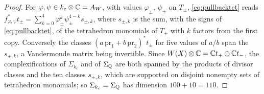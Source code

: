 \begin{proof}
For $\varphi,\psi\in k_{c}\otimes\mathbb{C}=A_{W}$, with values $\varphi_{\pm}$,
$\psi_{\pm}$ on $T_{\pm}$, \eqref{eq:pullbacktet} reads
$f_{\varphi,\psi}^{*}t_{\pm}=\sum_{k=0}^{4}\varphi_{\pm}^{k}\psi_{\pm}^{4-k}
s_{\pm,k}$, where $s_{\pm,k}$ is the sum, with the signs of
\eqref{eq:pullbacktet}, of the tetrahedron monomials of $T_{\pm}$ with $k$
factors from the first copy. Conversely the classes
$(a\,\mathrm{pr}_{1}+b\,\mathrm{pr}_{2})^{*}t_{\pm}$ for five values of $a/b$
span the $s_{\pm,k}$, a Vandermonde matrix being invertible. Since
$W(X)\otimes\mathbb{C}=\mathbb{C} t_{+}\oplus\mathbb{C} t_{-}$, the complexifications of
$\Sigma_{k_{c}}$ and of $\Sigma_{\mathbb{Q}}$ are both spanned by the products of
divisor classes and the ten classes $s_{\pm,k}$, which are supported on
disjoint nonempty sets of tetrahedron monomials; so
$\Sigma_{k_{c}}=\Sigma_{\mathbb{Q}}$ has dimension $100+10=110$.


\end{proof}

